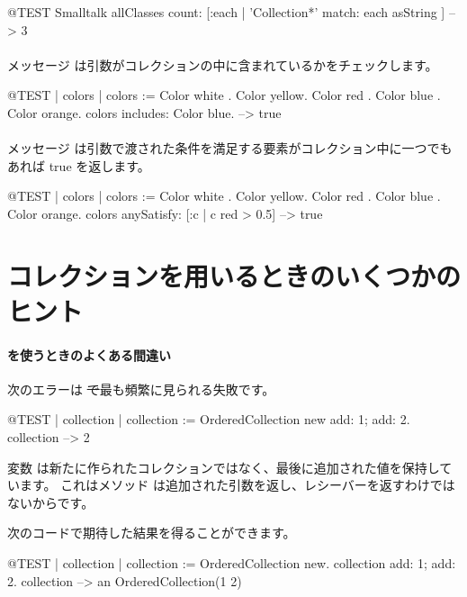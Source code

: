 \documentclass[a4paper,10pt,twoside]{book}
\begin{document}
\begin{code}{@TEST}
Smalltalk allClasses count: [:each | 'Collection*' match: each asString ] --> 3
\end{code}

\paragraph{} メッセージ  は引数がコレクションの中に含まれているかをチェックします。

\begin{code}{@TEST | colors |}
colors := {Color white . Color yellow. Color red . Color blue . Color orange}.
colors includes: Color blue. --> true
\end{code}

\paragraph{} メッセージ  は引数で渡された条件を満足する要素がコレクション中に一つでもあれば true を返します。

\begin{code}{@TEST | colors | colors := {Color white . Color yellow. Color red . Color blue . Color orange}.}
colors anySatisfy: [:c | c red > 0.5] --> true
\end{code}
\section{コレクションを用いるときのいくつかのヒント}

\paragraph{ を使うときのよくある間違い} 次のエラーは \st で最も頻繁に見られる失敗です。

\begin{code}{@TEST | collection | }
collection := OrderedCollection new add: 1; add: 2.
collection --> 2
\end{code}
\noindent
変数  は新たに作られたコレクションではなく、最後に追加された値を保持しています。
これはメソッド  は追加された引数を返し、レシーバーを返すわけではないからです。

次のコードで期待した結果を得ることができます。
\begin{code}{@TEST | collection |}
collection := OrderedCollection new.
collection add: 1; add: 2.
collection --> an OrderedCollection(1 2)
\end{code}
\end{document}
